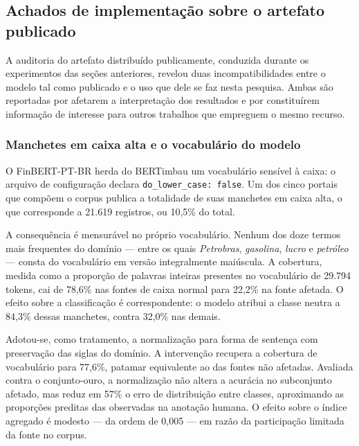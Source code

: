 \subsection{Achados de implementação sobre o artefato publicado}
\label{sec:achados_implementacao}

A auditoria do artefato distribuído publicamente, conduzida durante os experimentos das seções
anteriores, revelou duas incompatibilidades entre o modelo tal como publicado e o uso que dele se
faz nesta pesquisa. Ambas são reportadas por afetarem a interpretação dos resultados e por
constituírem informação de interesse para outros trabalhos que empreguem o mesmo recurso.

\subsubsection{Manchetes em caixa alta e o vocabulário do modelo}

O \mbox{FinBERT-PT-BR} herda do BERTimbau \cite{souza_bertimbau_2020} um vocabulário sensível à
caixa: o arquivo de configuração declara \texttt{do\_lower\_case: false}. Um dos cinco portais que
compõem o corpus publica a totalidade de suas manchetes em caixa alta, o que corresponde a 21.619
registros, ou 10,5\% do total.

A consequência é mensurável no próprio vocabulário. Nenhum dos doze termos mais frequentes do
domínio --- entre os quais \textit{Petrobras}, \textit{gasolina}, \textit{lucro} e
\textit{petróleo} --- consta do vocabulário em versão integralmente maiúscula. A cobertura, medida
como a proporção de palavras inteiras presentes no vocabulário de 29.794 tokens, cai de 78,6\% nas
fontes de caixa normal para 22,2\% na fonte afetada. O efeito sobre a classificação é
correspondente: o modelo atribui a classe neutra a 84,3\% dessas manchetes, contra 32,0\% nas
demais.

Adotou-se, como tratamento, a normalização para forma de sentença com preservação das siglas do
domínio. A intervenção recupera a cobertura de vocabulário para 77,6\%, patamar equivalente ao das
fontes não afetadas. Avaliada contra o conjunto-ouro, a normalização não altera a acurácia no
subconjunto afetado, mas reduz em 57\% o erro de distribuição entre classes, aproximando as
proporções preditas das observadas na anotação humana. O efeito sobre o índice agregado é modesto
--- da ordem de 0,005 --- em razão da participação limitada da fonte no corpus.


